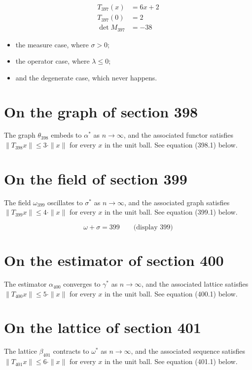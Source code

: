 \documentclass{article}
\begin{document}
\begin{align}
T_{397}(x) &= 6 x + 2 \\
T_{397}(0) &= 2 \\
\det M_{397} &= -38
\end{align}

\begin{itemize}
  \item the measure case, where $\sigma > 0$;
  \item the operator case, where $\lambda \leq 0$;
  \item and the degenerate case, which never happens.
\end{itemize}

\section{On the graph of section 398}
The graph $\theta_{398}$ embeds to $\alpha^{*}$ as $n \to \infty$,
and the associated functor satisfies $\|T_{398} x\| \leq 3 \cdot \|x\|$
for every $x$ in the unit ball. See equation (398.1) below.

\section{On the field of section 399}
The field $\omega_{399}$ oscillates to $\sigma^{*}$ as $n \to \infty$,
and the associated graph satisfies $\|T_{399} x\| \leq 4 \cdot \|x\|$
for every $x$ in the unit ball. See equation (399.1) below.

$$
\omega + \sigma = 399 \qquad \text{(display 399)}
$$

\section{On the estimator of section 400}
The estimator $\alpha_{400}$ converges to $\gamma^{*}$ as $n \to \infty$,
and the associated lattice satisfies $\|T_{400} x\| \leq 5 \cdot \|x\|$
for every $x$ in the unit ball. See equation (400.1) below.

\section{On the lattice of section 401}
The lattice $\beta_{401}$ contracts to $\omega^{*}$ as $n \to \infty$,
and the associated sequence satisfies $\|T_{401} x\| \leq 6 \cdot \|x\|$
for every $x$ in the unit ball. See equation (401.1) below.
\end{document}

